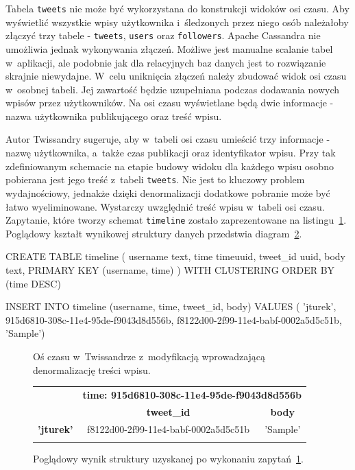 Tabela \verb+tweets+ nie może być wykorzystana do konstrukcji widoków osi czasu. Aby wyświetlić wszystkie wpisy użytkownika i~śledzonych przez niego osób należałoby złączyć trzy tabele - \verb+tweets+, \verb+users+ oraz \verb+followers+. Apache Cassandra nie umożliwia jednak wykonywania złączeń. Możliwe jest manualne scalanie tabel w~aplikacji, ale podobnie jak dla relacyjnych baz danych jest to rozwiązanie skrajnie niewydajne. W~celu uniknięcia złączeń należy zbudować widok osi czasu w~osobnej tabeli. Jej zawartość będzie uzupełniana podczas dodawania nowych wpisów przez użytkowników. Na osi czasu wyświetlane będą dwie informacje - nazwa użytkownika publikującego oraz treść wpisu. 

Autor Twissandry sugeruje, aby w~tabeli osi czasu umieścić trzy informacje - nazwę użytkownika, a~także czas publikacji oraz identyfikator wpisu. Przy tak zdefiniowanym schemacie na etapie budowy widoku dla każdego wpisu osobno pobierana jest jego treść z~tabeli \verb+tweets+. Nie jest to kluczowy problem wydajnościowy, jednakże dzięki denormalizacji dodatkowe pobranie może być łatwo wyeliminowane. Wystarczy uwzględnić treść wpisu w~tabeli osi czasu. Zapytanie, które tworzy schemat \verb+timeline+ zostało zaprezentowane na listingu~\ref{lst:timeline}. Poglądowy kształt wynikowej struktury danych przedstwia diagram~\ref{tab:timeline_structure}.

\begin{verbbox}
CREATE TABLE timeline (
    username text,
    time timeuuid,
    tweet_id uuid,
    body text,
    PRIMARY KEY (username, time)
) WITH CLUSTERING ORDER BY (time DESC)

INSERT INTO timeline (username, time, tweet_id, body) VALUES (
    'jturek',
    915d6810-308c-11e4-95de-f9043d8d556b,
    f8122d00-2f99-11e4-babf-0002a5d5c51b,
    'Sample')
\end{verbbox}

\begin{figure}[ht!]
	\centering
	\theverbbox
	\caption{Oś czasu w~Twissandrze z~modyfikacją wprowadzającą denormalizację treści wpisu.}
	\label{lst:timeline}
\end{figure}

\begin{figure}[ht!]
	\centering
	\begin{tabular}{|l||c|c|}
		\hhline{|-||--|}
		& \multicolumn{2}{|c|}{\textbf{time: 915d6810-308c-11e4-95de-f9043d8d556b}} \\
		\hhline{|~||==|}
		& \textbf{tweet\_id} & \textbf{body} \\
		\hhline{|~||==|}
		\textbf{'jturek'} & f8122d00-2f99-11e4-babf-0002a5d5c51b & 'Sample' \\
		\hhline{|-||--|}
	\end{tabular} 

	\caption{Poglądowy wynik struktury uzyskanej po wykonaniu zapytań~\ref{lst:timeline}.}
	\label{tab:timeline_structure}
\end{figure}

